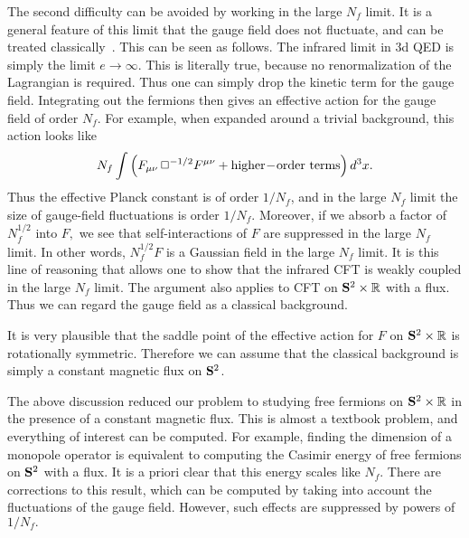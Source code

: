 \documentclass[a4paper,12pt, amsfonts, amssymb]{article}
\newcommand{\RR}{{\mathbb R}}
\newcommand{\ra}{\rightarrow}
\begin{document}
The second difficulty can be avoided by working in the large $N_f$ limit.
It is a general feature of this limit that the gauge field does not
fluctuate, and can be treated classically~\cite{AP,JT,AH}. 
This can be seen as follows.
The infrared limit in 3d QED is simply the limit $e\ra\infty$. This
is literally true, because no renormalization of the Lagrangian is
required. Thus one can simply drop the kinetic term for the gauge field.
Integrating out the fermions then gives an effective action for the
gauge field of order $N_f$. For example, when expanded around a trivial
background, this action looks like
$$
N_f \int \left(F_{\mu\nu}\,\Box^{-1/2} F^{\mu\nu} + 
{\rm higher\!-\! order\ terms}\right) d^3 x.
$$
Thus the effective Planck constant is of order $1/N_f$, and in the
large $N_f$ limit the size of gauge-field fluctuations is order $1/N_f$.
Moreover, if we absorb a factor of $N_f^{1/2}$ into $F,$ we see
that self-interactions of $F$ are suppressed in the large $N_f$ limit. 
In other words, $N_f^{1/2} F$ is a Gaussian field in the large $N_f$ limit.
It is this
line of reasoning that allows one to show that the infrared CFT is weakly
coupled in the large $N_f$ limit. The argument also applies
to CFT on ${\bf S}^2\times \RR$ with a flux. Thus we can regard the
gauge field as a classical background. 

It is very plausible that the
saddle point of the effective action for $F$ on ${\bf S}^2\times \RR$
is rotationally symmetric. Therefore we can assume that the classical
background is simply a constant magnetic flux on ${\bf S}^2$.

The above discussion reduced our problem to studying free fermions
on ${\bf S}^2\times \RR$ in the presence of a constant magnetic flux.
This is almost a textbook problem, and everything of interest can be
computed. For example, finding the dimension of a monopole operator 
is equivalent to computing the Casimir energy of free fermions on ${\bf S}^2$
with a flux. It is a priori clear that this energy scales like $N_f.$
There are corrections to this result, which can be computed
by taking into account the fluctuations of the gauge field. However, such
effects are suppressed by powers of $1/N_f.$
\end{document}
